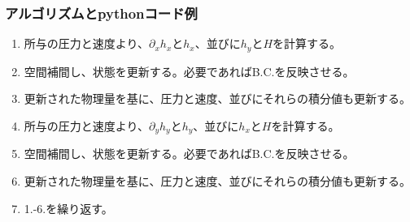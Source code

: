 \documentclass[dvipdfmx, 9pt, a4paper]{jsarticle}
\begin{document}
\subsubsection{アルゴリズムとpythonコード例}
\begin{tcolorbox}[title=CIP-CSL2による2次元移流方程式の解法]
\begin{enumerate}
\item 所与の圧力と速度より、$\partial_xh_x$と$h_x$、並びに$h_y$と$H$を計算する。
\item 空間補間し、状態を更新する。必要であればB.C.を反映させる。
\item 更新された物理量を基に、圧力と速度、並びにそれらの積分値も更新する。
\item 所与の圧力と速度より、$\partial_yh_y$と$h_y$、並びに$h_x$と$H$を計算する。
\item 空間補間し、状態を更新する。必要であればB.C.を反映させる。
\item 更新された物理量を基に、圧力と速度、並びにそれらの積分値も更新する。
\item 1.-6.を繰り返す。
\end{enumerate}
\end{tcolorbox}
\end{document}
